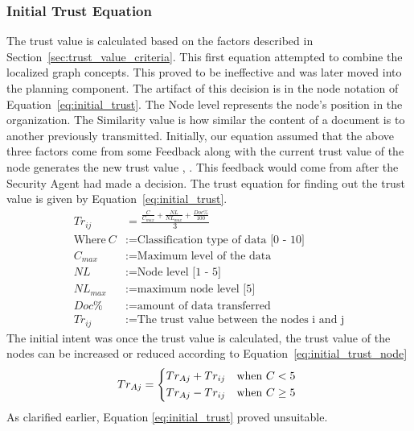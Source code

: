 \subsubsection{Initial Trust Equation}
\label{sec:initial_trust_equation}
The trust value is calculated based on the factors described in
Section~\ref{sec:trust_value_criteria}. This first equation attempted to combine
the localized graph concepts. This
proved to be ineffective and was later moved into the planning component. The
artifact of this decision is in the node notation of
Equation~\ref{eq:initial_trust}. 
The Node level represents the node's
position in the organization. The Similarity value is how similar the content of
a document is to another previously transmitted.  Initially, our equation
assumed that the above three factors come from some
Feedback along with the current trust value of the node generates the new trust
value \autocite{L.Xiong2004}, \autocite{YanWang2007}. This feedback would come
from after the Security Agent had made a decision. The trust equation for
finding out the trust value is given by Equation~\ref{eq:initial_trust}.
\begin{equation}
    \begin{aligned}
         Tr_{ij}&=\frac{\frac{C}{C_{max}} + \frac{NL}{NL_{max}} + \frac{Doc\%}{100}}{3} \\
    \text{Where}~C &:= \text{Classification type of data [0 - 10]} \\
C_{max} &:= \text{Maximum level of the data} \\
NL &:= \text{Node level [1 - 5]} \\
NL_{max} &:= \text{maximum node level [5]} \\
Doc\% &:= \text{amount of data transferred} \\
Tr_{ij} &:= \text{The trust value between the nodes i and j}
    \label{eq:initial_trust}
\end{aligned}
\end{equation}
The initial intent was once the trust value is calculated, the trust
value of the nodes can be increased or reduced according to
Equation~\ref{eq:initial_trust_node}
\begin{equation}
   Tr_{Aj} =    \begin{dcases*}
                    Tr_{Aj} + Tr_{ij} & when $C < 5$\\
                    Tr_{Aj} - Tr_{ij} & when $C \ge 5$
                \end{dcases*}
                \label{eq:initial_trust_node}
\end{equation}
As clarified earlier, Equation \ref{eq:initial_trust} proved unsuitable.

